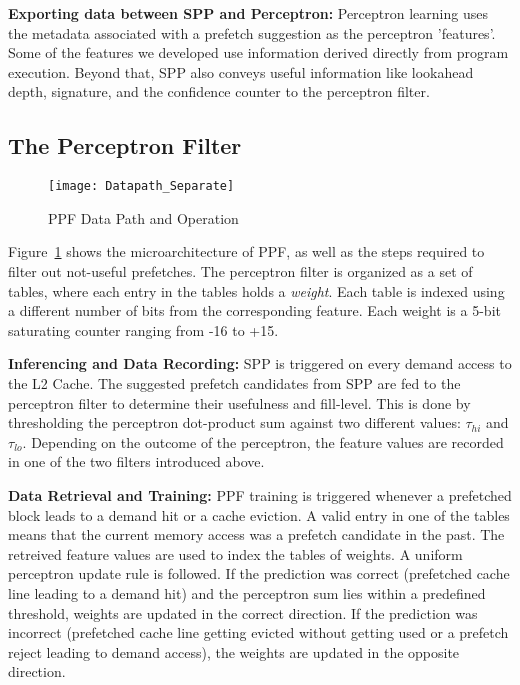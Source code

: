 \noindent \textbf{Exporting data between SPP and Perceptron:}
Perceptron learning uses the metadata associated with a prefetch suggestion as the
perceptron 'features'. Some of the features we developed use information derived 
directly from program execution. Beyond that, SPP also conveys useful 
information like lookahead depth, signature, and the confidence counter to the 
perceptron filter.

\subsection{The Perceptron Filter}
\label{Enhancements-PPF}

\begin{figure}[ht]
  \begin{center}
  \texttt{[image: Datapath\_Separate]}
  \caption{PPF Data Path and Operation}
  \label{fig:PPF_Datapath}
  \end{center}
\end{figure}

Figure~\ref{fig:PPF_Datapath} shows the microarchitecture of PPF, as
well as the steps required to filter out not-useful prefetches. The
perceptron filter is organized as a set of tables, where each entry in
the tables holds a \textit{weight}. Each table is indexed using a 
different number of bits from the corresponding feature. Each
weight is a 5-bit saturating counter ranging from -16 to +15. 

\noindent \textbf{Inferencing and Data Recording:}
SPP is triggered on every demand access to the L2 Cache. The suggested 
prefetch candidates from SPP are fed to the perceptron filter to determine 
their usefulness and fill-level. This is done by thresholding the perceptron 
dot-product sum against two different values: $\tau_{hi}$ and $\tau_{lo}$.
Depending on the outcome of the perceptron, the feature values are recorded
in one of the two filters introduced above.

\noindent \textbf{Data Retrieval and Training:}
PPF training is triggered whenever a prefetched block leads to a demand hit
or a cache eviction. A valid entry in one of the tables means that the current
memory access was a prefetch candidate in the past. The retreived feature values 
are used to index the tables of weights. A uniform perceptron update rule
is followed. If the prediction was correct (prefetched cache line leading to a 
demand hit) and the perceptron sum lies within a predefined threshold, weights are 
updated in the correct direction. If the prediction was incorrect (prefetched cache 
line getting evicted without getting used or a prefetch reject leading to demand 
access), the weights are updated in the opposite direction.

